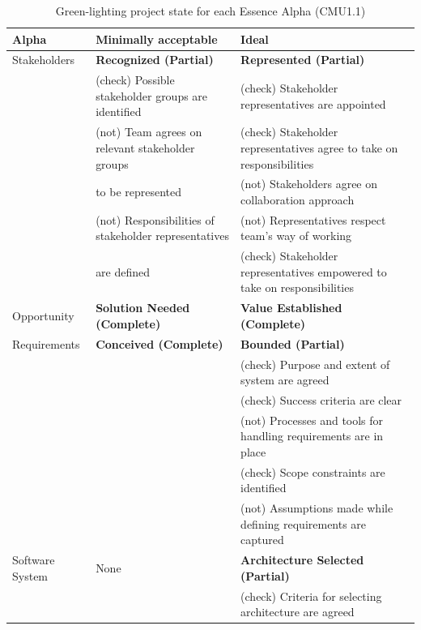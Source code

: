 \begin{table}
\renewcommand{\arraystretch}{1.3}
\caption{Green-lighting project state for each Essence Alpha (CMU1.1)}
\label{GreenLightingProjectState}
\begin{tabular}{|l|p{2.50in}|p{3.35in}|}
\hline
\textbf{Alpha}  & \textbf{Minimally acceptable}       & \textbf{Ideal}                        \\ \hline
Stakeholders    & \textbf{Recognized (Partial)}       & \textbf{Represented (Partial)}        \\ 
                & (check) Possible stakeholder groups are identified & (check) Stakeholder representatives are appointed \\
                & (not) Team agrees on relevant stakeholder groups & (check) Stakeholder representatives agree to take on responsibilities \\
                & to be represented                 & (not) Stakeholders agree on collaboration approach \\
                & (not) Responsibilities of stakeholder representatives  & (not) Representatives respect team's way of working \\
                & are defined                         & (check) Stakeholder representatives empowered to take on responsibilities \\ \hline
Opportunity     & \textbf{Solution Needed (Complete)} & \textbf{Value Established (Complete)} \\[5ex] \hline
Requirements    & \textbf{Conceived (Complete)}       & \textbf{Bounded (Partial)}            \\
                &                                     & (check) Purpose and extent of system are agreed \\
                &                                     & (check) Success criteria are clear \\
                &                                     & (not) Processes and tools for handling requirements are in place \\
                &                                     & (check) Scope constraints are identified \\
                &                                     & (not) Assumptions made while defining requirements are captured \\ \hline
Software System & None                                & \textbf{Architecture Selected (Partial)} \\
                &                                     & (check) Criteria for selecting architecture are agreed \\

\end{tabular}
\end{table}
